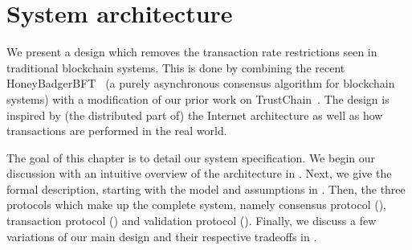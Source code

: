\chapter{System architecture}
\label{ch:model}






We present a design which removes the transaction rate restrictions seen in traditional blockchain systems.
This is done by combining the recent HoneyBadgerBFT~\cite{miller2016honey}
(a purely asynchronous consensus algorithm for blockchain systems)
with a modification of our prior work on TrustChain~\cite{trustchain}.
The design is inspired by (the distributed part of) the Internet architecture as well as how transactions are performed in the real world.

The goal of this chapter is to detail our system specification.
We begin our discussion with an intuitive overview of the architecture in .
Next, we give the formal description, starting with the model and assumptions in .
Then, the three protocols which make up the complete system,
namely consensus protocol (), transaction protocol () and validation protocol ().
Finally, we discuss a few variations of our main design and their respective tradeoffs in .

